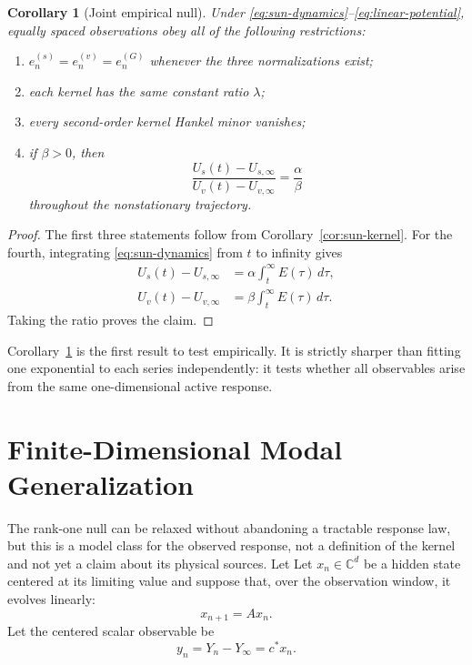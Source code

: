 \documentclass[10pt,twocolumn]{article}
\newtheorem{corollary}{Corollary}
\newcommand{\CC}{\mathbb{C}}
\begin{document}
\begin{corollary}[Joint empirical null]\label{cor:joint-null}
Under \eqref{eq:sun-dynamics}--\eqref{eq:linear-potential}, equally spaced
observations obey all of the following restrictions:
\begin{enumerate}
 \item $e_n^{(s)}=e_n^{(v)}=e_n^{(G)}$ whenever the three normalizations exist;
 \item each kernel has the same constant ratio $\lambda$;
 \item every second-order kernel Hankel minor vanishes;
 \item if $\beta>0$, then
 \[
  \frac{U_s(t)-U_{s,\infty}}{U_v(t)-U_{v,\infty}}
  =\frac{\alpha}{\beta}
 \]
 throughout the nonstationary trajectory.
\end{enumerate}
\end{corollary}

\begin{proof}
The first three statements follow from Corollary~\ref{cor:sun-kernel}.  For the
fourth, integrating \eqref{eq:sun-dynamics} from $t$ to infinity gives
\begin{align*}
 U_s(t)-U_{s,\infty}
 &=\alpha\int_t^\infty E(\tau)\,d\tau,\\
 U_v(t)-U_{v,\infty}
 &=\beta\int_t^\infty E(\tau)\,d\tau.
\end{align*}
Taking the ratio proves the claim.
\end{proof}

Corollary~\ref{cor:joint-null} is the first result to test empirically.  It is
strictly sharper than fitting one exponential to each series independently:
it tests whether all observables arise from the same one-dimensional active
response.

\section{Finite-Dimensional Modal Generalization}

The rank-one null can be relaxed without abandoning a tractable response law,
but this is a model class for the observed response, not a definition of the
kernel and not yet a claim about its physical sources.  Let
Let $x_n\in\CC^d$ be a hidden state centered at its limiting value and suppose
that, over the observation window, it evolves linearly:
\begin{equation}\label{eq:state-space}
 x_{n+1}=Ax_n.
\end{equation}
Let the centered scalar observable be
\begin{equation}\label{eq:observation}
 y_n=Y_n-Y_\infty=c^*x_n.
\end{equation}
\end{document}
